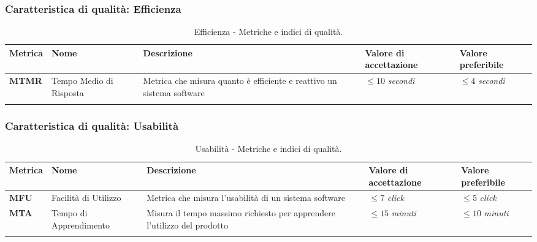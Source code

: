 \subsubsection{Caratteristica di qualità: Efficienza}
\hspace{1pt}
        \begin{longtable}{|C{1.5cm}|L{3cm}|L{4cm}|L{2.5cm}|L{2.5cm}|}
                    \hline
                    \textbf{Metrica} & \textbf{Nome} & \textbf{Descrizione} & \textbf{Valore di accettazione} & \textbf{Valore preferibile} \\
                    \hline
                    \textbf{MTMR} & Tempo Medio di Risposta & Metrica che misura quanto è efficiente e reattivo un sistema software & $\leq 10$ \textit{secondi}  & $\leq 4$ \textit{secondi} \\
                    \hline
                    \caption{Efficienza - Metriche e indici di qualità.}
        \label{tab:metriche_efficienza_testo}
    \end{longtable}

\subsubsection{Caratteristica di qualità: Usabilità}
\hspace{1pt}
            \begin{longtable}{|C{1.5cm}|L{3cm}|L{4cm}|L{2.5cm}|L{2.5cm}|}
                        \hline
                        \textbf{Metrica} & \textbf{Nome} & \textbf{Descrizione} & \textbf{Valore di accettazione} & \textbf{Valore preferibile} \\
                        \hline
                        \textbf{MFU} & Facilità di Utilizzo & Metrica che misura l'usabilità di un sistema software & $\leq 7$ \textit{click}  & $\leq 5$ \textit{click} \\
                        \hline
                        \textbf{MTA} & Tempo di Apprendimento & Misura il tempo massimo richiesto per apprendere l'utilizzo del prodotto & $\leq 15$ \textit{minuti}  & $\leq 10$ \textit{minuti} \\
                        \hline
                        \caption{Usabilità - Metriche e indici di qualità.}
            \label{tab:metriche_usabilità_testo}
        \end{longtable}

